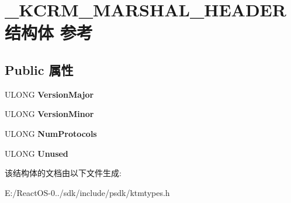\hypertarget{struct___k_c_r_m___m_a_r_s_h_a_l___h_e_a_d_e_r}{}\section{\+\_\+\+K\+C\+R\+M\+\_\+\+M\+A\+R\+S\+H\+A\+L\+\_\+\+H\+E\+A\+D\+E\+R结构体 参考}
\label{struct___k_c_r_m___m_a_r_s_h_a_l___h_e_a_d_e_r}
\subsection*{Public 属性}
\begin{DoxyCompactItemize}
\item 
\mbox{\label{struct___k_c_r_m___m_a_r_s_h_a_l___h_e_a_d_e_r_ab45eb2e3ef8057af4b00235db39203e8}} 
U\+L\+O\+NG {\bfseries Version\+Major}
\item 
\mbox{\label{struct___k_c_r_m___m_a_r_s_h_a_l___h_e_a_d_e_r_a313e323275b09dce3c3dc86c07ec04a5}} 
U\+L\+O\+NG {\bfseries Version\+Minor}
\item 
\mbox{\label{struct___k_c_r_m___m_a_r_s_h_a_l___h_e_a_d_e_r_aeb21259e4157af4a46df47b074f0d261}} 
U\+L\+O\+NG {\bfseries Num\+Protocols}
\item 
\mbox{\label{struct___k_c_r_m___m_a_r_s_h_a_l___h_e_a_d_e_r_a5099cd521f64f74447d9ea7442c75a1f}} 
U\+L\+O\+NG {\bfseries Unused}
\end{DoxyCompactItemize}


该结构体的文档由以下文件生成\+:\begin{DoxyCompactItemize}
\item 
E\+:/\+React\+O\+S-\/0../sdk/include/psdk/ktmtypes.\+h\end{DoxyCompactItemize}
